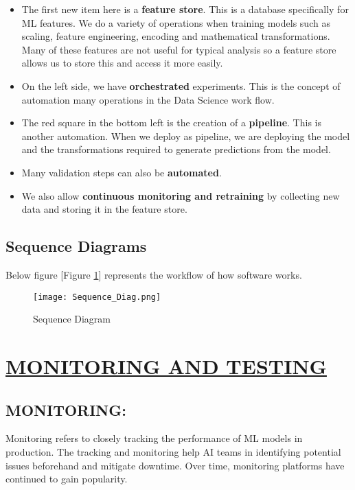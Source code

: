 \documentclass[12pt,oneside,a4paper]{report}
\begin{document}
\begin{itemize}
\item The first new item here is a \textbf{feature store}. This is a database specifically for ML features. We do a variety of operations when training models such as scaling, feature engineering, encoding and mathematical transformations. Many of these features are not useful for typical analysis so a feature store allows us to store this and access it more easily.
\item On the left side, we have \textbf{orchestrated} experiments. This is the concept of automation many operations in the Data Science work flow.
\item The red square in the bottom left is the creation of a \textbf{pipeline}. This is another automation. When we deploy as pipeline, we are deploying the model and the transformations required to generate predictions from the model.
\item Many validation steps can also be \textbf{automated}.
\item We also allow \textbf{continuous monitoring and retraining} by collecting new data and storing it in the feature store.
\end{itemize}

\section{Sequence Diagrams}
\fontsize{12pt}{10pt}\selectfont
Below figure [Figure \ref{fig_Sequence_Diag}] represents the workflow of how software works.


\begin{figure}[h]
\centering
\texttt{[image: Sequence\_Diag.png]}
\caption{Sequence Diagram}
\label{fig_Sequence_Diag}
\end{figure}

\chapter{\underline{MONITORING AND TESTING}}
\section{MONITORING:}
\fontsize{12pt}{10pt}\selectfont
\vspace{5.0mm} Monitoring refers to closely tracking the performance of ML models in production. The tracking and monitoring help AI teams in identifying potential issues beforehand and mitigate downtime. Over time, monitoring platforms have continued to gain popularity.
\end{document}
